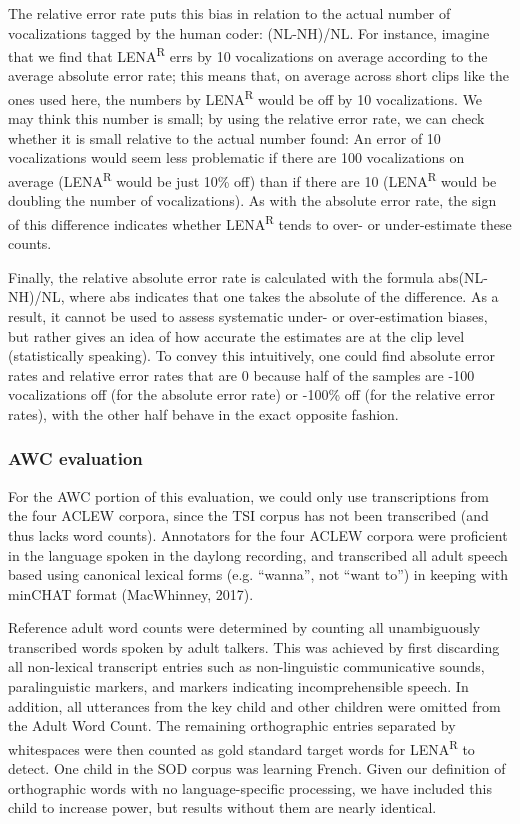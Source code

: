 \documentclass[english,table,man,floatsintext]{apa6}
\begin{document}
The relative error rate puts this bias in relation to the actual number of vocalizations tagged by the human coder: (NL-NH)/NL. For instance, imagine that we find that LENA\textsuperscript{R} errs by 10 vocalizations on average according to the average absolute error rate; this means that, on average across short clips like the ones used here, the numbers by LENA\textsuperscript{R} would be off by 10 vocalizations. We may think this number is small; by using the relative error rate, we can check whether it is small relative to the actual number found: An error of 10 vocalizations would seem less problematic if there are 100 vocalizations on average (LENA\textsuperscript{R} would be just 10\% off) than if there are 10 (LENA\textsuperscript{R} would be doubling the number of vocalizations). As with the absolute error rate, the sign of this difference indicates whether LENA\textsuperscript{R} tends to over- or under-estimate these counts.

Finally, the relative absolute error rate is calculated with the formula abs(NL-NH)/NL, where abs indicates that one takes the absolute of the difference. As a result, it cannot be used to assess systematic under- or over-estimation biases, but rather gives an idea of how accurate the estimates are at the clip level (statistically speaking). To convey this intuitively, one could find absolute error rates and relative error rates that are 0 because half of the samples are -100 vocalizations off (for the absolute error rate) or -100\% off (for the relative error rates), with the other half behave in the exact opposite fashion.

\hypertarget{awc-evaluation}{%
\subsubsection{AWC evaluation}\label{awc-evaluation}}

For the AWC portion of this evaluation, we could only use transcriptions from the four ACLEW corpora, since the TSI corpus has not been transcribed (and thus lacks word counts). Annotators for the four ACLEW corpora were proficient in the language spoken in the daylong recording, and transcribed all adult speech based using canonical lexical forms (e.g. \enquote{wanna}, not \enquote{want to}) in keeping with minCHAT format (MacWhinney, 2017).

Reference adult word counts were determined by counting all unambiguously transcribed words spoken by adult talkers. This was achieved by first discarding all non-lexical transcript entries such as non-linguistic communicative sounds, paralinguistic markers, and markers indicating incomprehensible speech. In addition, all utterances from the key child and other children were omitted from the Adult Word Count. The remaining orthographic entries separated by whitespaces were then counted as gold standard target words for LENA\textsuperscript{R} to detect. One child in the SOD corpus was learning French. Given our definition of orthographic words with no language-specific processing, we have included this child to increase power, but results without them are nearly identical.
\end{document}

